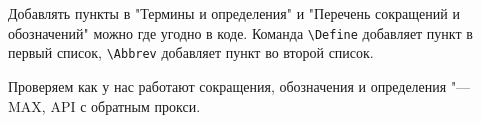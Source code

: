 \Introduction

Добавлять пункты в "{}Термины и определения"{} и "{}Перечень сокращений и обозначений"{} можно где угодно в коде. Команда \verb|\Define| добавляет пункт в первый список, \verb|\Abbrev| добавляет пункт во второй список. 

Проверяем как у нас работают сокращения, обозначения и определения "---
MAX,
API
с обратным прокси.
